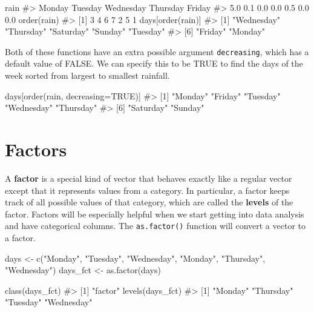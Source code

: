 \documentclass[
  letterpaper,
]{krantz}
\makeatletter
\newenvironment{Shaded}{\begin{snugshade}}{\end{snugshade}}
\newcommand{\AttributeTok}[1]{\textcolor[rgb]{0.40,0.45,0.13}{#1}}
\newcommand{\CommentTok}[1]{\textcolor[rgb]{0.37,0.37,0.37}{#1}}
\newcommand{\ConstantTok}[1]{\textcolor[rgb]{0.56,0.35,0.01}{#1}}
\newcommand{\FunctionTok}[1]{\textcolor[rgb]{0.28,0.35,0.67}{#1}}
\newcommand{\NormalTok}[1]{\textcolor[rgb]{0.00,0.23,0.31}{#1}}
\newcommand{\OtherTok}[1]{\textcolor[rgb]{0.00,0.23,0.31}{#1}}
\newcommand{\StringTok}[1]{\textcolor[rgb]{0.13,0.47,0.30}{#1}}
\newenvironment{kframe}{%
\medskip{}
\setlength{\fboxsep}{.8em}
 \def\at@end@of@kframe{}%
 \ifinner\ifhmode%
  \def\at@end@of@kframe{\end{minipage}}%
  \begin{minipage}{\columnwidth}%
 \fi\fi%
 \def\FrameCommand##1{\hskip\@totalleftmargin \hskip-\fboxsep
 \colorbox{shadecolor}{##1}\hskip-\fboxsep
     \hskip-\linewidth \hskip-\@totalleftmargin \hskip\columnwidth}%
 \MakeFramed {\advance\hsize-\width
   \@totalleftmargin\z@ \linewidth\hsize
   \@setminipage}}%
 {\par\unskip\endMakeFramed%
 \at@end@of@kframe}
\renewenvironment{Shaded}{\begin{kframe}}{\end{kframe}}
\makeatother
\begin{document}
\begin{Shaded}
\begin{Highlighting}[]
\NormalTok{rain}
\CommentTok{\#\textgreater{}    Monday   Tuesday Wednesday  Thursday    Friday                     }
\CommentTok{\#\textgreater{}       5.0       0.1       0.0       0.0       0.5       0.0       0.0}
\FunctionTok{order}\NormalTok{(rain)}
\CommentTok{\#\textgreater{} [1] 3 4 6 7 2 5 1}
\NormalTok{days[}\FunctionTok{order}\NormalTok{(rain)]}
\CommentTok{\#\textgreater{} [1] "Wednesday" "Thursday"  "Saturday"  "Sunday"    "Tuesday"  }
\CommentTok{\#\textgreater{} [6] "Friday"    "Monday"}
\end{Highlighting}
\end{Shaded}

Both of these functions have an extra possible argument
\texttt{decreasing}, which has a default value of FALSE. We can specify
this to be TRUE to find the days of the week sorted from largest to
smallest rainfall.

\begin{Shaded}
\begin{Highlighting}[]
\NormalTok{days[}\FunctionTok{order}\NormalTok{(rain, }\AttributeTok{decreasing=}\ConstantTok{TRUE}\NormalTok{)]}
\CommentTok{\#\textgreater{} [1] "Monday"    "Friday"    "Tuesday"   "Wednesday" "Thursday" }
\CommentTok{\#\textgreater{} [6] "Saturday"  "Sunday"}
\end{Highlighting}
\end{Shaded}

\section{Factors}\label{factors}

A \textbf{factor} is a special kind of vector that behaves exactly like
a regular vector except that it represents values from a category. In
particular, a factor keeps track of all possible values of that
category, which are called the \textbf{levels} of the factor. Factors
will be especially helpful when we start getting into data analysis and
have categorical columns. The \texttt{as.factor()} function will convert
a vector to a factor.

\begin{Shaded}
\begin{Highlighting}[]
\NormalTok{days }\OtherTok{\textless{}{-}} \FunctionTok{c}\NormalTok{(}\StringTok{"Monday"}\NormalTok{, }\StringTok{"Tuesday"}\NormalTok{, }\StringTok{"Wednesday"}\NormalTok{, }\StringTok{"Monday"}\NormalTok{, }
          \StringTok{"Thursday"}\NormalTok{, }\StringTok{"Wednesday"}\NormalTok{)}
\NormalTok{days\_fct }\OtherTok{\textless{}{-}} \FunctionTok{as.factor}\NormalTok{(days)}

\FunctionTok{class}\NormalTok{(days\_fct)}
\CommentTok{\#\textgreater{} [1] "factor"}
\FunctionTok{levels}\NormalTok{(days\_fct)}
\CommentTok{\#\textgreater{} [1] "Monday"    "Thursday"  "Tuesday"   "Wednesday"}
\end{Highlighting}
\end{Shaded}
\end{document}
